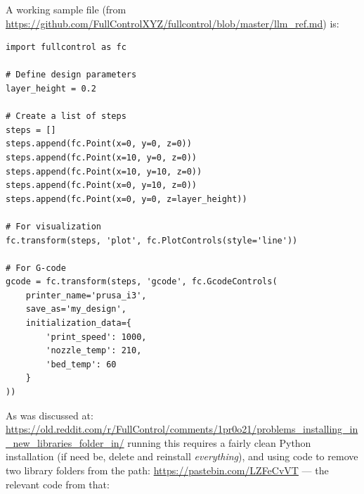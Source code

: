 \documentclass{ltxdoc}
\begin{document}
A working sample file (from \url{https://github.com/FullControlXYZ/fullcontrol/blob/master/llm_ref.md}) is:

\begin{verbatim}
import fullcontrol as fc

# Define design parameters
layer_height = 0.2

# Create a list of steps
steps = []
steps.append(fc.Point(x=0, y=0, z=0))
steps.append(fc.Point(x=10, y=0, z=0))
steps.append(fc.Point(x=10, y=10, z=0))
steps.append(fc.Point(x=0, y=10, z=0))
steps.append(fc.Point(x=0, y=0, z=layer_height))

# For visualization
fc.transform(steps, 'plot', fc.PlotControls(style='line'))

# For G-code
gcode = fc.transform(steps, 'gcode', fc.GcodeControls(
    printer_name='prusa_i3',
    save_as='my_design',
    initialization_data={
        'print_speed': 1000,
        'nozzle_temp': 210,
        'bed_temp': 60
    }
))

\end{verbatim}

As was discussed at: \url{https://old.reddit.com/r/FullControl/comments/1pr0o21/problems_installing_in_new_libraries_folder_in/} running this requires a fairly clean Python installation (if need be, delete and reinstall \emph{everything}), and using code to remove two library folders from the path: \url{https://pastebin.com/LZFeCvVT} --- the relevant code from that:
\end{document}
